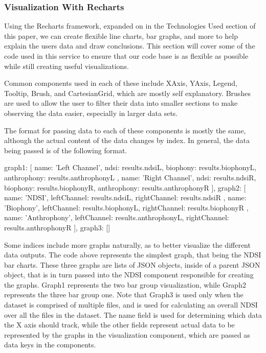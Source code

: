 \subsubsection{Visualization With Recharts}
Using the Recharts framework, expanded on in the Technologies Used section of this paper, we can create flexible line charts, bar graphs, and more to help explain the user\textquotesingle s data and draw conclusions. This section will cover some of the code used in this service to ensure that our code base is as flexible as possible while still creating useful visualizations.\par
Common components used in each of these include XAxis, YAxis, Legend, Tooltip, Brush, and CartesianGrid, which are mostly self explanatory. Brushes are used to allow the user to filter their data into smaller sections to make observing the data easier, especially in larger data sets.\par
The format for passing data to each of these components is mostly the same, although the actual content of the data changes by index. In general, the data being passed is of the following format.\par

\begin{javascriptcode}
{
  graph1: [
            {
              name: 'Left Channel',
              ndsi: results.ndsiL,
              biophony: results.biophonyL,
              anthrophony: results.anthrophonyL
            },
            {
              name: 'Right Channel',
              ndsi: results.ndsiR,
              biophony: results.biophonyR,
              anthrophony: results.anthrophonyR
            }
          ],
  graph2: [
            {
              name: 'NDSI',
              leftChannel: results.ndsiL,
              rightChannel: results.ndsiR
            },
            {
              name: 'Biophony',
              leftChannel: results.biophonyL,
              rightChannel: results.biophonyR
            },
            {
              name: 'Anthrophony',
              leftChannel: results.anthrophonyL,
              rightChannel: results.anthrophonyR
            }
          ],
  graph3: []
}
\end{javascriptcode}

Some indices include more graphs naturally, as to better visualize the different data outputs. The code above represents the simplest graph, that being the NDSI bar charts. These three graphs are lists of JSON objects, inside of a parent JSON object, that is in turn passed into the NDSI component responsible for creating the graphs. Graph1 represents the two bar group visualization, while Graph2 represents the three bar group one. Note that Graph3 is used only when the dataset is comprised of multiple files, and is used for calculating an overall NDSI over all the files in the dataset. The name field is used for determining which data the X axis should track, while the other fields represent actual data to be represented by the graphs in the visualization component, which are passed as data keys in the components.
